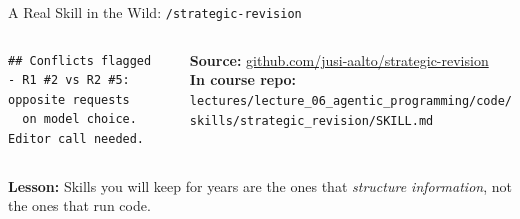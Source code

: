 \documentclass[aspectratio=169,10pt]{beamer}
\begin{document}
\begin{frame}[fragile]{A Real Skill in the Wild: \texttt{/strategic-revision}}
\begin{columns}[T]
\begin{lstlisting}[basicstyle=\tiny\ttfamily, frame=single]
## Conflicts flagged
- R1 #2 vs R2 #5: opposite requests
  on model choice. Editor call needed.
\end{lstlisting}

\vspace{0.2em}
\textbf{Source:} \href{https://github.com/jusi-aalto/strategic-revision}{github.com/jusi-aalto/strategic-revision}\\
\textbf{In course repo:} \texttt{lectures/lecture\_06\_agentic\_programming/code/}\\
\phantom{xx}\texttt{skills/strategic\_revision/SKILL.md}
\end{columns}

\vspace{0.2em}
\textbf{Lesson:} Skills you will keep for years are the ones that
\emph{structure information}, not the ones that run code.
\end{frame}
\end{document}
